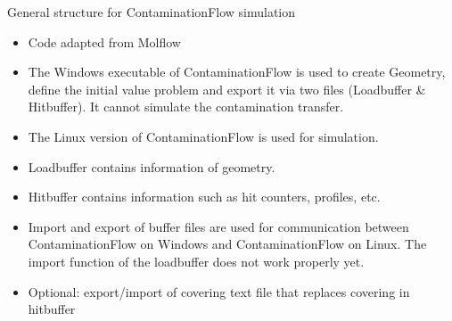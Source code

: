 \begin{center}
\end{center}
\vspace{1cm}
General structure for ContaminationFlow simulation
\begin{itemize}[noitemsep,topsep=2pt]
\item Code adapted from Molflow
\item The Windows executable of ContaminationFlow is used to create Geometry, define the initial value problem and export it via two files (Loadbuffer \& Hitbuffer). It cannot simulate the contamination transfer.
\item The Linux version of ContaminationFlow is used for simulation.
\item Loadbuffer contains information of geometry.
\item Hitbuffer contains information such as hit counters, profiles, etc.
\item Import and export of buffer files are used for communication between ContaminationFlow on Windows and ContaminationFlow on Linux. The import function of the loadbuffer does not work properly yet.
\item Optional: export/import of covering text file that replaces covering in hitbuffer
\end{itemize}